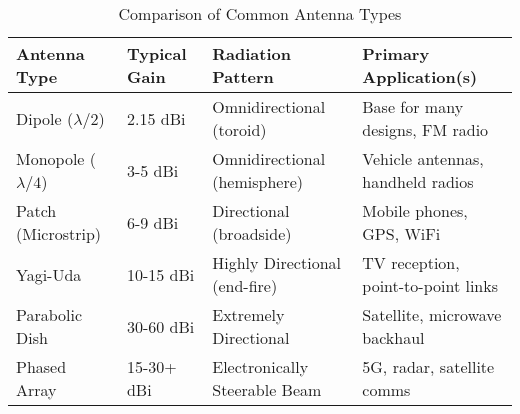 \begin{table}[H]
    \centering
    \caption{Comparison of Common Antenna Types}
    \label{tab:antenna-types}
    \begin{tabularx}{\textwidth}{@{}lXXX@{}}
        \toprule
        \tableheaderfont Antenna Type & \tableheaderfont Typical Gain & \tableheaderfont Radiation Pattern & \tableheaderfont Primary Application(s) \\
        \midrule
        Dipole ($\lambda/2$) & 2.15 dBi & Omnidirectional (toroid) & Base for many designs, FM radio \\
        Monopole ($\lambda/4$) & 3-5 dBi & Omnidirectional (hemisphere) & Vehicle antennas, handheld radios \\
        Patch (Microstrip) & 6-9 dBi & Directional (broadside) & Mobile phones, GPS, WiFi \\
        Yagi-Uda & 10-15 dBi & Highly Directional (end-fire) & TV reception, point-to-point links \\
        Parabolic Dish & 30-60 dBi & Extremely Directional & Satellite, microwave backhaul \\
        Phased Array & 15-30+ dBi & Electronically Steerable Beam & 5G, radar, satellite comms \\
        \bottomrule
    \end{tabularx}
\end{table}


